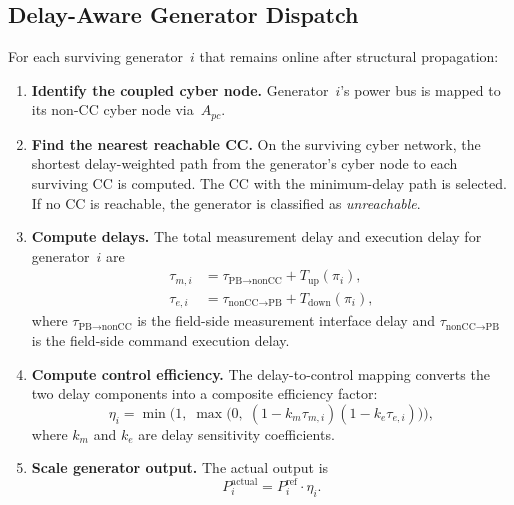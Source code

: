 \documentclass[a4paper,fleqn]{cas-dc}
\begin{document}
\subsection{Delay-Aware Generator Dispatch}\label{sec:delay_dispatch}

For each surviving generator~$i$ that remains online after structural
propagation:

\begin{enumerate}
\item \textbf{Identify the coupled cyber node.}  Generator~$i$'s power
  bus is mapped to its non-CC cyber node via~$A_{pc}$.

\item \textbf{Find the nearest reachable CC.}  On the surviving cyber
  network, the shortest delay-weighted path from the generator's cyber
  node to each surviving CC is computed.  The CC with the minimum-delay
  path is selected.  If no CC is reachable, the generator is classified
  as \emph{unreachable}.

\item \textbf{Compute delays.}  The total measurement delay and
  execution delay for generator~$i$ are
  \begin{align}
    \tau_{m,i} &= \tau_{\text{PB}\to\text{nonCC}}
                  + T_{\text{up}}(\pi_i), \label{eq:tau_m}\\
    \tau_{e,i} &= \tau_{\text{nonCC}\to\text{PB}}
                  + T_{\text{down}}(\pi_i), \label{eq:tau_e}
  \end{align}
  where $\tau_{\text{PB}\to\text{nonCC}}$ is the field-side measurement
  interface delay and $\tau_{\text{nonCC}\to\text{PB}}$ is the
  field-side command execution delay.

\item \textbf{Compute control efficiency.}  The delay-to-control
  mapping converts the two delay components into a composite efficiency
  factor:
  \begin{equation}\label{eq:eta}
    \eta_i = \min\!\bigl(1,\;\max\!\bigl(0,\;
      (1-k_m\tau_{m,i})(1-k_e\tau_{e,i})\bigr)\bigr),
  \end{equation}
  where $k_m$ and $k_e$ are delay sensitivity coefficients.

\item \textbf{Scale generator output.}  The actual output is
  \begin{equation}\label{eq:Pactual}
    P_i^{\text{actual}} = P_i^{\text{ref}}\cdot\eta_i.
  \end{equation}
\end{enumerate}
\end{document}
